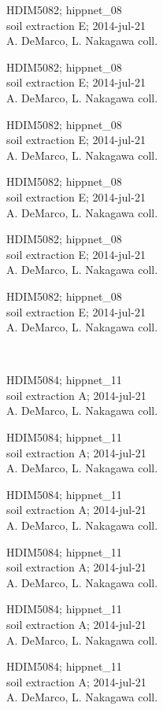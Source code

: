 \documentclass[2pt]{extarticle}
\begin{document}
\noindent
\parbox{0.16\textwidth}{\tiny \raggedright \rule[-0.3\baselineskip]{0pt}{10pt}HDIM5082; hippnet\_08\\ soil extraction E; 2014-jul-21\\ A. DeMarco, L. Nakagawa coll.}
\parbox{0.16\textwidth}{\tiny \raggedright \rule[-0.3\baselineskip]{0pt}{10pt}HDIM5082; hippnet\_08\\ soil extraction E; 2014-jul-21\\ A. DeMarco, L. Nakagawa coll.}
\parbox{0.16\textwidth}{\tiny \raggedright \rule[-0.3\baselineskip]{0pt}{10pt}HDIM5082; hippnet\_08\\ soil extraction E; 2014-jul-21\\ A. DeMarco, L. Nakagawa coll.}
\parbox{0.16\textwidth}{\tiny \raggedright \rule[-0.3\baselineskip]{0pt}{10pt}HDIM5082; hippnet\_08\\ soil extraction E; 2014-jul-21\\ A. DeMarco, L. Nakagawa coll.}
\parbox{0.16\textwidth}{\tiny \raggedright \rule[-0.3\baselineskip]{0pt}{10pt}HDIM5082; hippnet\_08\\ soil extraction E; 2014-jul-21\\ A. DeMarco, L. Nakagawa coll.}
\parbox{0.16\textwidth}{\tiny \raggedright \rule[-0.3\baselineskip]{0pt}{10pt}HDIM5082; hippnet\_08\\ soil extraction E; 2014-jul-21\\ A. DeMarco, L. Nakagawa coll.} \\ 
\vspace{0.001in} 

\noindent
\parbox{0.16\textwidth}{\tiny \raggedright \rule[-0.3\baselineskip]{0pt}{10pt}HDIM5084; hippnet\_11\\ soil extraction A; 2014-jul-21\\ A. DeMarco, L. Nakagawa coll.}
\parbox{0.16\textwidth}{\tiny \raggedright \rule[-0.3\baselineskip]{0pt}{10pt}HDIM5084; hippnet\_11\\ soil extraction A; 2014-jul-21\\ A. DeMarco, L. Nakagawa coll.}
\parbox{0.16\textwidth}{\tiny \raggedright \rule[-0.3\baselineskip]{0pt}{10pt}HDIM5084; hippnet\_11\\ soil extraction A; 2014-jul-21\\ A. DeMarco, L. Nakagawa coll.}
\parbox{0.16\textwidth}{\tiny \raggedright \rule[-0.3\baselineskip]{0pt}{10pt}HDIM5084; hippnet\_11\\ soil extraction A; 2014-jul-21\\ A. DeMarco, L. Nakagawa coll.}
\parbox{0.16\textwidth}{\tiny \raggedright \rule[-0.3\baselineskip]{0pt}{10pt}HDIM5084; hippnet\_11\\ soil extraction A; 2014-jul-21\\ A. DeMarco, L. Nakagawa coll.}
\parbox{0.16\textwidth}{\tiny \raggedright \rule[-0.3\baselineskip]{0pt}{10pt}HDIM5084; hippnet\_11\\ soil extraction A; 2014-jul-21\\ A. DeMarco, L. Nakagawa coll.} \\ 
\vspace{0.001in} 
\end{document}
